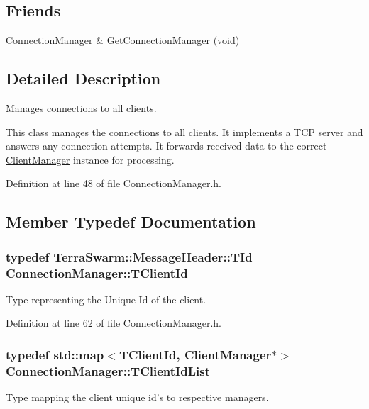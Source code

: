 \subsection*{Friends}
\begin{DoxyCompactItemize}
\item 
\hyperlink{class_connection_manager}{Connection\-Manager} \& \hyperlink{class_connection_manager_ab88124ce7a3bf1d2892d0e9763d1af30}{Get\-Connection\-Manager} (void)
\end{DoxyCompactItemize}


\subsection{Detailed Description}
Manages connections to all clients. 

This class manages the connections to all clients. It implements a T\-C\-P server and answers any connection attempts. It forwards received data to the correct \hyperlink{class_client_manager}{Client\-Manager} instance for processing. 

Definition at line 48 of file Connection\-Manager.\-h.



\subsection{Member Typedef Documentation}
\hypertarget{class_connection_manager_a0c3634c02b95af84a477b253fcf2b29a}{
\subsubsection[{T\-Client\-Id}]{\setlength{\rightskip}{0pt plus 5cm}typedef {\bf Terra\-Swarm\-::\-Message\-Header\-::\-T\-Id} {\bf Connection\-Manager\-::\-T\-Client\-Id}\hspace{0.3cm}{\ttfamily [private]}}}\label{class_connection_manager_a0c3634c02b95af84a477b253fcf2b29a}
Type representing the Unique Id of the client. 

Definition at line 62 of file Connection\-Manager.\-h.

\hypertarget{class_connection_manager_a78c371deff0ac4add801b3c64216a467}{
\subsubsection[{T\-Client\-Id\-List}]{\setlength{\rightskip}{0pt plus 5cm}typedef std\-::map$<${\bf T\-Client\-Id}, {\bf Client\-Manager}$\ast$$>$ {\bf Connection\-Manager\-::\-T\-Client\-Id\-List}\hspace{0.3cm}{\ttfamily [private]}}}\label{class_connection_manager_a78c371deff0ac4add801b3c64216a467}
Type mapping the client unique id's to respective managers. 

